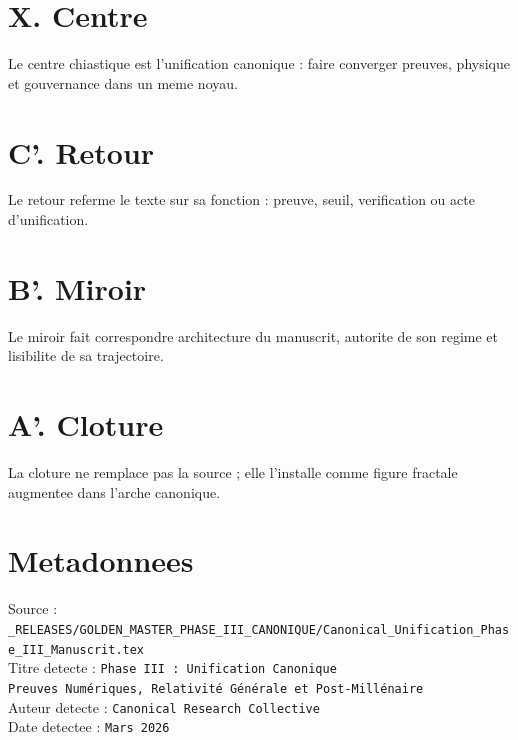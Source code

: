 \documentclass[11pt,a4paper]{article}
\begin{document}
\section*{X. Centre}
Le centre chiastique est l'unification canonique : faire converger preuves, physique et gouvernance dans un meme noyau.

\section*{C'. Retour}
Le retour referme le texte sur sa fonction : preuve, seuil, verification ou acte d'unification.

\section*{B'. Miroir}
Le miroir fait correspondre architecture du manuscrit, autorite de son regime et lisibilite de sa trajectoire.

\section*{A'. Cloture}
La cloture ne remplace pas la source ; elle l'installe comme figure fractale augmentee dans l'arche canonique.

\section*{Metadonnees}
Source : \verb|_RELEASES/GOLDEN_MASTER_PHASE_III_CANONIQUE/Canonical_Unification_Phase_III_Manuscrit.tex|\\
Titre detecte : \texttt{Phase III : Unification Canonique \\ Preuves Numériques, Relativité Générale et Post-Millénaire}\\
Auteur detecte : \texttt{Canonical Research Collective}\\
Date detectee : \texttt{Mars 2026}
\end{document}
